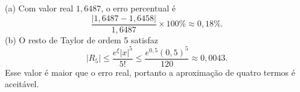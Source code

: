 (a) Com valor real $1{,}6487$, o erro percentual é
\[
\frac{|1{,}6487-1{,}6458|}{1{,}6487}\times100\%\approx0{,}18\%.
\]
(b) O resto de Taylor de ordem 5 satisfaz
\[
|R_{5}| \le \frac{e^{\xi}|x|^{5}}{5!}\le \frac{e^{0{,}5}(0{,}5)^{5}}{120}\approx0{,}0043.
\]
Esse valor é maior que o erro real, portanto a aproximação de quatro termos é aceitável. 